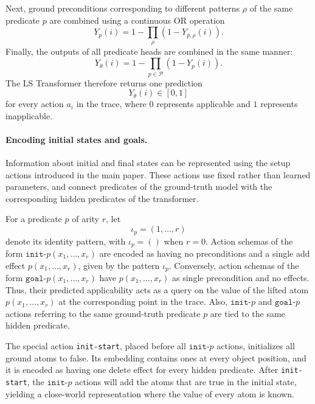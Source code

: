 Next, ground preconditions corresponding to different patterns $\rho$ of the same predicate $p$ are combined using a continuous OR operation
\begin{equation}
Y_p(i)
=
1-
\prod_{\rho}
\left(
1-Y_{p,\rho}(i)
\right).
\label{eq:strips-pattern-or}
\end{equation}
Finally, the outputs of all predicate heads are combined in the same manner:
\begin{equation}
Y_{\theta}(i)
=
1-
\prod_{p\in\mathcal{P}}
\left(
1-Y_p(i)
\right).
\label{eq:strips-predicate-or}
\end{equation}
The LS Transformer therefore returns one prediction
\begin{equation}
Y_{\theta}(i)\in[0,1]
\end{equation}
for every action $a_i$ in the trace, where $0$ represents applicable and $1$ represents inapplicable.

\paragraph{Encoding initial states and goals.}
Information about initial and final states can be represented using the setup actions introduced in the main paper. These actions use fixed rather than learned parameters, 
and connect predicates of the ground-truth model with the corresponding hidden predicates of the transformer.

For a predicate $p$ of arity $r$, let
\begin{equation}
\iota_p=(1,\ldots,r)
\end{equation}
denote its identity pattern, with $\iota_p=()$ when $r=0$.
Action schemas of the form $\texttt{init-}p(x_1,\ldots,x_r)$ are encoded as having no preconditions and a single add effect $p(x_1,\ldots,x_r)$, given by the pattern $\iota_p$.
Conversely, action schemas of the form $\texttt{goal-}p(x_1,\ldots,x_r)$ have $p(x_1,\ldots,x_r)$ as single precondition and no effects.
Thus, their predicted applicability acts as a query on the value of the lifted atom $p(x_1,\ldots,x_r)$ at the corresponding point in the trace.
Also, $\texttt{init-}p$ and $\texttt{goal-}p$ actions referring to the same ground-truth predicate $p$ are tied to the same hidden predicate.

The special action \texttt{init-start}, placed before all $\texttt{init-}p$ actions, initializes all ground atoms to false.
Its embedding contains ones at every object position, 
and it is encoded as having one delete effect for every hidden predicate.
After \texttt{init-start}, the $\texttt{init-}p$ actions will add the atoms that are true in the initial state, yielding a close-world representation where the value of every atom is known.


